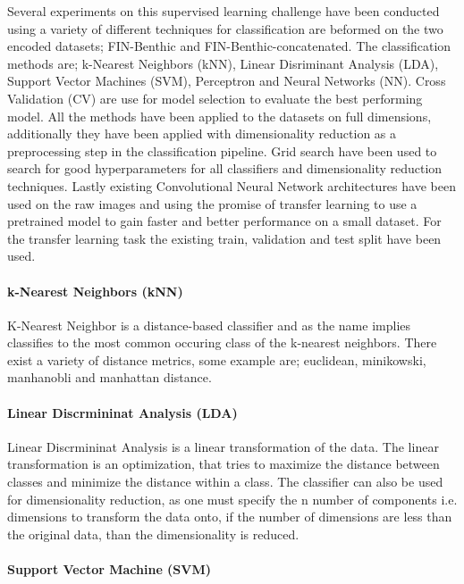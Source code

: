 Several experiments on this supervised learning challenge have been conducted using a variety of different techniques for classification are beformed on the two encoded datasets; FIN-Benthic and FIN-Benthic-concatenated. The classification methods are; k-Nearest Neighbors (kNN), Linear Disriminant Analysis (LDA), Support Vector Machines (SVM), Perceptron and Neural Networks (NN). Cross Validation (CV) are use for model selection to evaluate the best performing model. All the methods have been applied to the datasets on full dimensions, additionally they have been applied with dimensionality reduction as a preprocessing step in the classification pipeline. Grid search have been used to search for good hyperparameters for all classifiers and dimensionality reduction techniques. Lastly existing Convolutional Neural Network architectures have been used on the raw images and using the promise of transfer learning to use a pretrained model to gain faster and better performance on a small dataset. For the transfer learning task the existing train, validation and test split have been used.

\paragraph{k-Nearest Neighbors (kNN)}

K-Nearest Neighbor is a distance-based classifier and as the name implies classifies to the most common occuring class of the k-nearest neighbors. There exist a variety of distance metrics, some example are; euclidean, minikowski, manhanobli and manhattan distance. 

\paragraph{Linear Discrmininat Analysis (LDA)}

Linear Discrmininat Analysis is a linear transformation of the data. The linear transformation is an optimization, that tries to maximize the distance between classes and minimize the distance within a class. The classifier can also be used for dimensionality reduction, as one must specify the n number of components i.e. dimensions to transform the data onto, if the number of dimensions are less than the original data, than the dimensionality is reduced. 

\paragraph{Support Vector Machine (SVM)}

